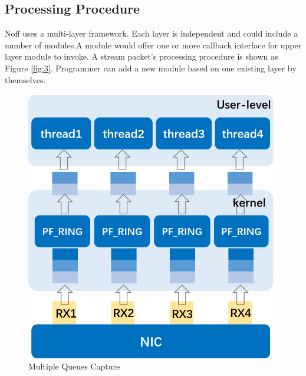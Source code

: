 \documentclass[conference]{IEEEtran}
\begin{document}
\subsection{Processing Procedure}
Noff uses a multi-layer framework. Each layer is independent and could include a number of modules.A module would offer one or more callback interface for upper layer module to invoke. A stream packet's processing procedure is shown as Figure \ref{fig:3}.
Programmer can add a new module based on one existing layer by themselves.
\begin{figure}
\begin{minipage}[t]{0.495\linewidth}
\flushleft
\includegraphics[width=\textwidth]{./picture/Figure1.jpg}
\caption{Multiple Queues Capture} 
\label{fig:1}
\end{minipage}
\begin{minipage}[t]{0.495\linewidth}
\flushright

\end{minipage}
\end{figure}
\end{document}
